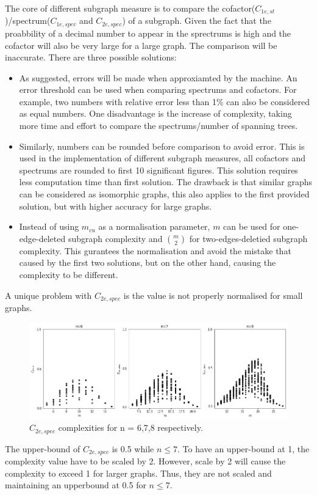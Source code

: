 \documentclass[12pt]{article}
\begin{document}
The core of different subgraph measure is to compare the cofactor($C_{1e,st}$)/spectrum($C_{1e,spec}$ and $C_{2e,spec}$) of a subgraph. Given the fact that the proabbility of a decimal number to appear in the sprectrums is high and the cofactor will also be very large for a large graph. The comparison will be inaccurate. There are three possible solutions:
\begin{itemize}
    \item As suggested, errors will be made when approxiamted by the machine. An error threshold can be used when comparing spectrums and cofactors. For example, two numbers with relative error less than 1\% can also be considered as equal numbers. One disadvantage is the increase of complexity, taking more time and effort to compare the spectrums/number of spanning trees.
    \item Similarly, numbers can be rounded before comparison to avoid error. This is used in the implementation of different subgraph measures, all cofactors and spectrums are rounded to first 10 significant figures. This solution requires less computation time than first solution. The drawback is that similar graphs can be considered as isomorphic graphs, this also applies to the first provided solution, but with higher accuracy for large graphs.
    \item Instead of using $m_{cu}$ as a normalisation parameter, $m$ can be used for one-edge-deleted subgraph complexity and $\genfrac(){0pt}{2}{m}{2}$ for two-edges-deletied subgraph complexity. This gurantees the normalisation and avoid the mistake that caused by the first two solutions, but on the other hand, causing the complexity to be different.
\end{itemize}
A unique problem with $C_{2e,spec}$ is the value is not properly normalised for small graphs.

\begin{figure}[ht]
    \includegraphics[width = \textwidth]{c2espec.png}
    \caption{$C_{2e,spec}$ complexities for n = 6,7,8 respectively.}
    \centering
\end{figure}
\noindent
The upper-bound of $C_{2e,spec}$ is 0.5 while $ n\leq7 $. To have an upper-bound at 1, the complexity value have to be scaled by 2. However, scale by 2 will cause the complexity to exceed 1 for larger graphs. Thus, they are not scaled and maintaining an upperbound at 0.5 for $n \leq 7$.
\end{document}
